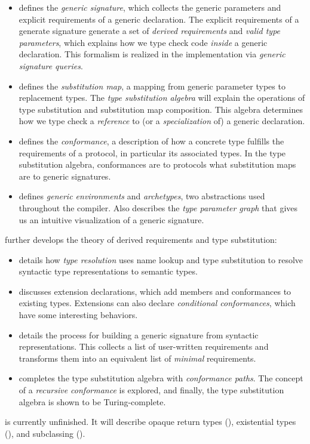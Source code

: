 \documentclass[../generics]{subfiles}
\begin{document}
\begin{itemize}
\item {} defines the \emph{generic signature}, which collects the generic parameters and explicit requirements of a generic declaration. The explicit requirements of a generate signature generate a set of \emph{derived requirements} and \emph{valid type parameters}, which explains how we type check code \emph{inside} a generic declaration. This formalism is realized in the implementation via \emph{generic signature queries}.

\item {} defines the \emph{substitution map}, a mapping from generic parameter types to replacement types. The \emph{type substitution algebra} will explain the operations of type substitution and substitution map composition. This algebra determines how we type check a \emph{reference} to (or a \emph{specialization} of) a generic declaration.

\item {} defines the \emph{conformance}, a description of how a concrete type fulfills the requirements of a protocol, in particular its associated types. In the type substitution algebra, conformances are to protocols what substitution maps are to generic signatures.

\item {} defines \emph{generic environments} and \emph{archetypes}, two abstractions used throughout the compiler. Also describes the \emph{type parameter graph} that gives us an intuitive visualization of a generic signature.
\end{itemize}
 further develops the theory of derived requirements and type substitution:
\begin{itemize}
\item {} details how \emph{type resolution} uses name lookup and type substitution to resolve syntactic type representations to semantic types.

\item {} discusses extension declarations, which add members and conformances to existing types. Extensions can also declare \emph{conditional conformances}, which have some interesting behaviors.

\item {} details the process for building a generic signature from syntactic representations. This collects a list of user-written requirements and transforms them into an equivalent list of \emph{minimal} requirements.

\item {} completes the type substitution algebra with \emph{conformance paths}. The concept of a \emph{recursive conformance} is explored, and finally, the type substitution algebra is shown to be Turing-complete.
\end{itemize}
 is currently unfinished. It will describe opaque return types (), existential types (), and subclassing ().
\end{document}
